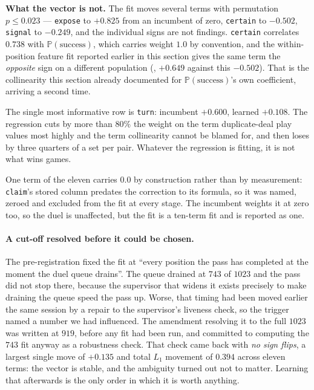 \documentclass[11pt,letterpaper]{article}
\newcommand{\Prob}{\ensuremath{\mathbb{P}}}
\begin{document}
\textbf{What the vector is not.} The fit moves several terms with permutation
$p \le 0.023$ --- \texttt{expose} to $+0.825$ from an incumbent of zero,
\texttt{certain} to $-0.502$, \texttt{signal} to $-0.249$, and the
individual signs are not findings. \texttt{certain} correlates $0.738$ with
$\Prob(\text{success})$, which carries weight $1.0$ by convention, and the
within-position feature fit reported earlier in this section gives the same
term the \emph{opposite} sign on a different population
(, $+0.649$ against this
$-0.502$). That is the collinearity this
section already documented for $\Prob(\text{success})$'s own coefficient,
arriving a second time.

The single most informative row is \texttt{turn}: incumbent $+0.600$, learned
$+0.108$. The regression cuts by more than $80\%$ the weight on the term
duplicate-deal play values most highly and the term collinearity cannot be
blamed for, and then loses by three quarters of a set per pair. Whatever the
regression is fitting, it is not what wins games.

One term of the eleven carries $0.0$ by construction rather than by
measurement: \texttt{claim}'s stored column predates the correction to its
formula, so it was named, zeroed and excluded from the fit at every stage. The
incumbent weights it at zero too, so the duel is unaffected, but the fit is
a ten-term fit and is reported as one.

\paragraph{A cut-off resolved before it could be chosen.} The pre-registration
fixed the fit at ``every position the pass has completed at the moment the duel
queue drains''. The queue drained at $743$ of $1023$ and the pass did not stop
there, because the supervisor that widens it exists precisely to make draining
the queue speed the pass up. Worse, that timing had been moved earlier the same
session by a repair to the supervisor's liveness check, so the trigger named
a number we had influenced. The amendment resolving it to the full $1023$ was
written at $919$, before any fit had been run, and committed to computing the
$743$ fit anyway as a robustness check. That check came back with \emph{no sign
flips}, a largest single move of $+0.135$ and total $L_1$ movement of $0.394$
across eleven terms: the vector is stable, and the ambiguity turned out not to
matter. Learning that afterwards is the only order in which it is worth
anything.
\end{document}
